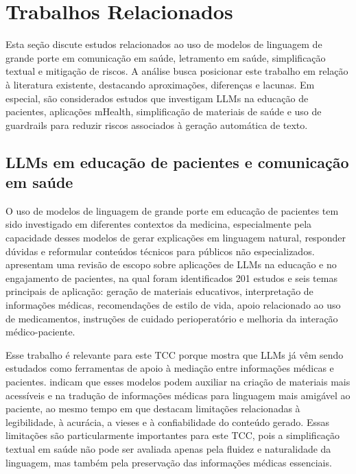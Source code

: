 \chapter{Trabalhos Relacionados}
\label{cap:trabalhos-relacionados}

Esta seção discute estudos relacionados ao uso de modelos de linguagem de grande porte em comunicação em saúde, letramento em saúde, simplificação textual e mitigação de riscos. A análise busca posicionar este trabalho em relação à literatura existente, destacando aproximações, diferenças e lacunas. Em especial, são considerados estudos que investigam LLMs na educação de pacientes, aplicações mHealth, simplificação de materiais de saúde e uso de guardrails para reduzir riscos associados à geração automática de texto.

\section{LLMs em educação de pacientes e comunicação em saúde}
\label{sec:llms-educacao-pacientes-comunicacao-saude}

O uso de modelos de linguagem de grande porte em educação de pacientes tem sido investigado em diferentes contextos da medicina, especialmente pela capacidade desses modelos de gerar explicações em linguagem natural, responder dúvidas e reformular conteúdos técnicos para públicos não especializados.  apresentam uma revisão de escopo sobre aplicações de LLMs na educação e no engajamento de pacientes, na qual foram identificados 201 estudos e seis temas principais de aplicação: geração de materiais educativos, interpretação de informações médicas, recomendações de estilo de vida, apoio relacionado ao uso de medicamentos, instruções de cuidado perioperatório e melhoria da interação médico-paciente.

Esse trabalho é relevante para este TCC porque mostra que LLMs já vêm sendo estudados como ferramentas de apoio à mediação entre informações médicas e pacientes.  indicam que esses modelos podem auxiliar na criação de materiais mais acessíveis e na tradução de informações médicas para linguagem mais amigável ao paciente, ao mesmo tempo em que destacam limitações relacionadas à legibilidade, à acurácia, a vieses e à confiabilidade do conteúdo gerado. Essas limitações são particularmente importantes para este TCC, pois a simplificação textual em saúde não pode ser avaliada apenas pela fluidez e naturalidade da linguagem, mas também pela preservação das informações médicas essenciais.

